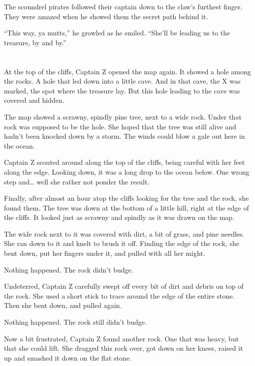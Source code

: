 \documentclass[12pt]{extbook}
\begin{document}
  The scoundrel pirates followed their captain down to the claw's furthest
  finger. They were amazed when he showed them the secret path behind it.
  
  \enquote{This way, ya mutts,} he growled as he smiled. \enquote{She'll
  be leading us to the treasure, by and by.}
  
  \section{}\label{section-18}
  
  At the top of the cliffs, Captain Z opened the map again. It showed a
  hole among the rocks. A hole that led down into a little cave. And in
  that cave, the X was marked, the spot where the treasure lay. But this
  hole leading to the cave was covered and hidden.
  
  The map showed a scrawny, spindly pine tree, next to a wide rock. Under
  that rock was supposed to be the hole. She hoped that the tree was still
  alive and hadn't been knocked down by a storm. The winds could blow a
  gale out here in the ocean.
  
  Captain Z scouted around along the top of the cliffs, being careful with
  her feet along the edge. Looking down, it was a long drop to the ocean
  below. One wrong step and\ldots{} well she rather not ponder the result.
  
  Finally, after almost an hour atop the cliffs looking for the tree and
  the rock, she found them. The tree was down at the bottom of a little
  hill, right at the edge of the cliffs. It looked just as scrawny and
  spindly as it was drawn on the map.
  
  The wide rock next to it was covered with dirt, a bit of grass, and pine
  needles. She ran down to it and knelt to brush it off. Finding the edge
  of the rock, she bent down, put her fingers under it, and pulled with
  all her might.
  
  Nothing happened. The rock didn't budge.
  
  Undeterred, Captain Z carefully swept off every bit of dirt and debris
  on top of the rock. She used a short stick to trace around the edge of
  the entire stone. Then she bent down, and pulled again.
  
  Nothing happened. The rock still didn't budge.
  
  Now a bit frustrated, Captain Z found another rock. One that was heavy,
  but that she could lift. She dragged this rock over, got down on her
  knees, raised it up and smashed it down on the flat stone.
  
\end{document}

